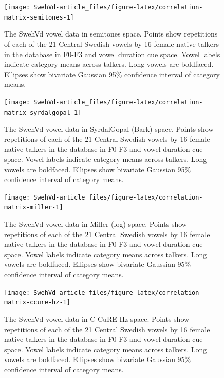 \documentclass[utf8]{frontiersSCNS}
\begin{document}
\begin{figure}
\texttt{[image: SwehVd-article\_files/figure-latex/correlation-matrix-semitones-1]} \caption{The SwehVd vowel data in semitones space. Points show repetitions of each of the 21 Central Swedish vowels by 16 female native talkers in the database in F0-F3 and vowel duration cue space. Vowel labels indicate category means across talkers. Long vowels are boldfaced. Ellipses show bivariate Gaussian 95\% confidence interval of category means.}\label{fig:correlation-matrix-semitones}
\end{figure}



\begin{figure}
\texttt{[image: SwehVd-article\_files/figure-latex/correlation-matrix-syrdalgopal-1]} \caption{The SwehVd vowel data in SyrdalGopal (Bark) space. Points show repetitions of each of the 21 Central Swedish vowels by 16 female native talkers in the database in F0-F3 and vowel duration cue space. Vowel labels indicate category means across talkers. Long vowels are boldfaced. Ellipses show bivariate Gaussian 95\% confidence interval of category means.}\label{fig:correlation-matrix-syrdalgopal}
\end{figure}



\begin{figure}
\texttt{[image: SwehVd-article\_files/figure-latex/correlation-matrix-miller-1]} \caption{The SwehVd vowel data in Miller (log) space. Points show repetitions of each of the 21 Central Swedish vowels by 16 female native talkers in the database in F0-F3 and vowel duration cue space. Vowel labels indicate category means across talkers. Long vowels are boldfaced. Ellipses show bivariate Gaussian 95\% confidence interval of category means.}\label{fig:correlation-matrix-miller}
\end{figure}



\begin{figure}
\texttt{[image: SwehVd-article\_files/figure-latex/correlation-matrix-ccure-hz-1]} \caption{The SwehVd vowel data in C-CuRE Hz space. Points show repetitions of each of the 21 Central Swedish vowels by 16 female native talkers in the database in F0-F3 and vowel duration cue space. Vowel labels indicate category means across talkers. Long vowels are boldfaced. Ellipses show bivariate Gaussian 95\% confidence interval of category means.}\label{fig:correlation-matrix-ccure-hz}
\end{figure}
\end{document}
